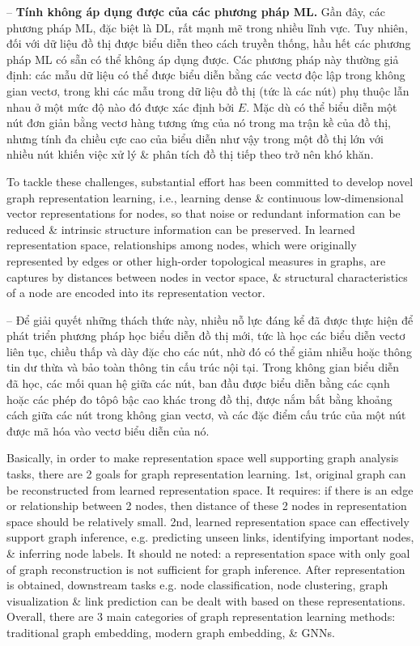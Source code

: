 \documentclass{article}
\begin{document}
\begin{itemize}
\begin{itemize}
\begin{enumerate}
            -- {\bf Tính không áp dụng được của các phương pháp ML.} Gần đây, các phương pháp ML, đặc biệt là DL, rất mạnh mẽ trong nhiều lĩnh vực. Tuy nhiên, đối với dữ liệu đồ thị được biểu diễn theo cách truyền thống, hầu hết các phương pháp ML có sẵn có thể không áp dụng được. Các phương pháp này thường giả định: các mẫu dữ liệu có thể được biểu diễn bằng các vectơ độc lập trong không gian vectơ, trong khi các mẫu trong dữ liệu đồ thị (tức là các nút) phụ thuộc lẫn nhau ở một mức độ nào đó được xác định bởi $E$. Mặc dù có thể biểu diễn một nút đơn giản bằng vectơ hàng tương ứng của nó trong ma trận kề của đồ thị, nhưng tính đa chiều cực cao của biểu diễn như vậy trong một đồ thị lớn với nhiều nút khiến việc xử lý \& phân tích đồ thị tiếp theo trở nên khó khăn.
        \end{enumerate}
        To tackle these challenges, substantial effort has been committed to develop novel graph representation learning, i.e., learning dense \& continuous low-dimensional vector representations for nodes, so that noise or redundant information can be reduced \& intrinsic structure information can be preserved. In learned representation space, relationships among nodes, which were originally represented by edges or other high-order topological measures in graphs, are captures by distances between nodes in vector space, \& structural characteristics of a node are encoded into its representation vector.

        -- Để giải quyết những thách thức này, nhiều nỗ lực đáng kể đã được thực hiện để phát triển phương pháp học biểu diễn đồ thị mới, tức là học các biểu diễn vectơ liên tục, chiều thấp và dày đặc cho các nút, nhờ đó có thể giảm nhiễu hoặc thông tin dư thừa và bảo toàn thông tin cấu trúc nội tại. Trong không gian biểu diễn đã học, các mối quan hệ giữa các nút, ban đầu được biểu diễn bằng các cạnh hoặc các phép đo tôpô bậc cao khác trong đồ thị, được nắm bắt bằng khoảng cách giữa các nút trong không gian vectơ, và các đặc điểm cấu trúc của một nút được mã hóa vào vectơ biểu diễn của nó.

        Basically, in order to make representation space well supporting graph analysis tasks, there are 2 goals for graph representation learning. 1st, original graph can be reconstructed from learned representation space. It requires: if there is an edge or relationship between 2 nodes, then distance of these 2 nodes in representation space should be relatively small. 2nd, learned representation space can effectively support graph inference, e.g. predicting unseen links, identifying important nodes, \& inferring node labels. It should ne noted: a representation space with only goal of graph reconstruction is not sufficient for graph inference. After representation is obtained, downstream tasks e.g. node classification, node clustering, graph visualization \& link prediction can be dealt with based on these representations. Overall, there are 3 main categories of graph representation learning methods: traditional graph embedding, modern graph embedding, \& GNNs.


\end{itemize}
\end{itemize}
\end{document}
